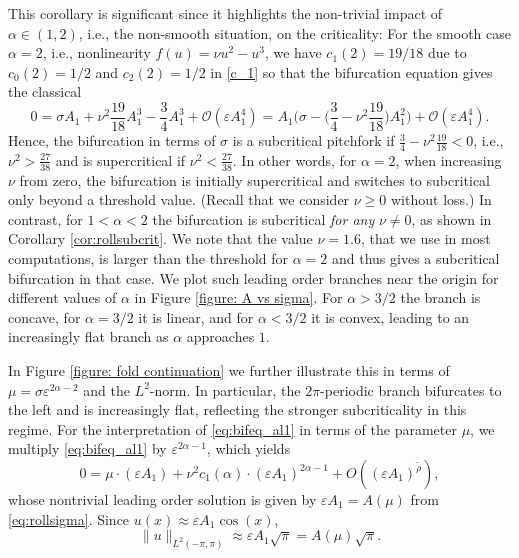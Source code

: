 \documentclass{article}
\numberwithin{equation}{section}
\def\eps{\varepsilon}
\def\calO{\mathcal{O}}
\begin{document}
 This corollary is significant since it highlights the non-trivial impact of $\alpha\in(1,2)$, i.e., the non-smooth situation, on the criticality:  
For the smooth case $\alpha = 2$, i.e., nonlinearity $f(u) = \nu u^2 - u^3$, we have $c_1(2) = 19/18$ due to $c_0(2) = 1/2$ and $c_2(2) = 1/2$ in \eqref{c_1} so that the bifurcation equation gives the classical 
\begin{equation}\label{e:bifeqal2}
0 = \sigma A_1 + \nu^2 \frac{19}{18} A_1^3 - \frac{3}{4} A_1^3 + \calO(\varepsilon A_1^4 ) 
= A_1 \biggl( \sigma - \biggl( \frac{3}{4} - \nu^2 \frac{19}{18} \biggl) A_1^2 \biggl) + \calO(\varepsilon A_1^4).
\end{equation} 
Hence, the bifurcation in terms of $\sigma$ is a subcritical pitchfork if  $\frac{3}{4} - \nu^2 \frac{19}{18} < 0$, i.e., $\nu^2 >\frac{27}{38}$ and is supercritical if $\nu^2 <\frac{27}{38}$. In other words, for $\alpha=2$, when increasing $\nu$ from zero, the bifurcation is initially supercritical and switches to subcritical only beyond a threshold value. (Recall that we consider $\nu\geq 0$ without loss.) In contrast, for $1<\alpha<2$ the bifurcation is subcritical \textit{for any} $\nu\neq 0$, as shown in Corollary \ref{cor:rollsubcrit}. We note that the value $\nu=1.6$, that we use in most computations, is larger than the threshold for $\alpha=2$ and thus gives a subcritical bifurcation in that case.  
We plot such leading order branches near the origin for different values of $\alpha$ in Figure \ref{figure: A vs sigma}. For $\alpha > 3/2$ the branch is concave, for $\alpha =3/2$ it is linear, and for $\alpha< 3/2$ it is convex, leading to an increasingly flat branch as $\alpha$ approaches $1$.

In Figure \ref{figure: fold continuation} we further illustrate this in terms of $\mu=\sigma \eps^{2\alpha-2}$ and the $L^2$-norm. In particular, the $2\pi$-periodic branch bifurcates to the left and is increasingly flat, reflecting the stronger subcriticality in this regime. For the interpretation of \eqref{eq:bifeq_al1} in terms of the parameter $\mu$, we multiply \eqref{eq:bifeq_al1} by $\varepsilon ^{2\alpha -1}$, which yields
\begin{equation}\label{eq:bifeq_al1_1}
0 = \mu \cdot(\varepsilon A_1) +\nu^2 c_1(\alpha) \cdot(\varepsilon A_1)^{2\alpha -1} + O((\varepsilon A_1)^{\tilde\rho}),
\end{equation}
whose nontrivial leading order solution is given by $\varepsilon A_1 = A(\mu)$ from \eqref{eq:rollsigma}. Since $u(x) \approx \varepsilon A_1 \cos (x)$, 
 \[
\|u\|_{L^2(-\pi,\pi)} \approx \varepsilon A_1 \sqrt{\pi} =  A(\mu) \sqrt{\pi}.
\]
\end{document}

